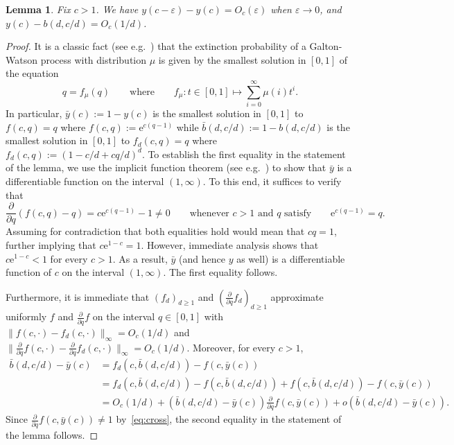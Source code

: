 \documentclass[reqno,final,a4paper]{amsart}
\newtheorem{lemma}[thm]{Lemma}
\theoremstyle{definition}
\def\e{\mathrm{e}}
\def\eps{\varepsilon}
\newcommand{\1}{\mathbbm{1}}
\begin{document}
\begin{lemma}\label{lem:yb}
Fix $c>1$. We have $y(c-\eps)-y(c)=O_c(\eps)$ when $\eps\to 0$, and $y(c)-b(d,c/d) = O_c(1/d)$.
\end{lemma}
\begin{proof}
It is a classic fact (see e.g.\ \cite[Theorem~3.1]{vdH18}) that the extinction probability of a Galton-Watson process with distribution $\mu$ is given by the smallest solution in $[0,1]$ of the equation
\[q=f_\mu(q)\qquad\text{where}\qquad f_\mu:t\in [0,1]\mapsto \sum_{i=0}^{\infty} \mu(i)t^i.\]
In particular, $\bar y(c) := 1-y(c)$ is the smallest solution in $[0,1]$ to $f(c,q)=q$ where $f(c,q):=\e^{c(q-1)}$ while $\bar b(d,c/d) := 1-b(d,c/d)$ is the smallest solution in $[0,1]$ to $f_d(c,q)=q$ where $f_d(c,q):=(1-c/d+cq/d)^d$.
To establish the first equality in the statement of the lemma, we use the implicit function theorem (see e.g.\ \cite[Theorem 2-12]{Spi65}) to show that $\bar y$ is a differentiable function on the interval $(1,\infty)$. To this end, it suffices to verify that
\begin{equation}\label{eq:cross}
\frac{\partial}{\partial q}(f(c,q)-q)=c\e^{c(q-1)}-1 \neq 0\qquad \text{whenever $c>1$ and $q$ satisfy}\qquad \e^{c(q-1)}=q.
\end{equation}
Assuming for contradiction that both equalities hold would mean that $cq=1$, further implying that $c\e^{1-c}=1$. However, immediate analysis shows that $c\e^{1-c}<1$ for every $c>1$. As a result, $\bar y$ (and hence $y$ as well) is a differentiable function of $c$ on the interval $(1,\infty)$. The first equality follows.

Furthermore, it is immediate that $(f_d)_{d\ge 1}$ and $(\tfrac{\partial}{\partial q}f_d)_{d\ge 1}$ approximate uniformly $f$ and $\tfrac{\partial}{\partial q}f$ on the interval $q\in [0,1]$ with $\|f(c,\cdot)-f_d(c,\cdot)\|_{\infty} = O_c(1/d)$ and $\|\tfrac{\partial}{\partial q}f(c,\cdot)-\tfrac{\partial}{\partial q}f_d(c,\cdot)\|_{\infty} = O_c(1/d)$.
Moreover, for every $c>1$,
\begin{align*}
\bar b(d,c/d) - \bar y(c) 
&= f_d(c,\bar b(d,c/d))-f(c,\bar y(c))\\
&= f_d(c,\bar b(d,c/d))-f(c,\bar b(d,c/d))+f(c,\bar b(d,c/d))-f(c,\bar y(c))\\
&= O_c(1/d)+(\bar b(d,c/d) - \bar y(c))\frac{\partial}{\partial q}f(c,\bar y(c)) + o(\bar b(d,c/d) - \bar y(c)).
\end{align*}
Since $\frac{\partial}{\partial q}f(c,\bar y(c))\neq 1$ by~\eqref{eq:cross}, the second equality in the statement of the lemma follows.
\end{proof}
\end{document}
